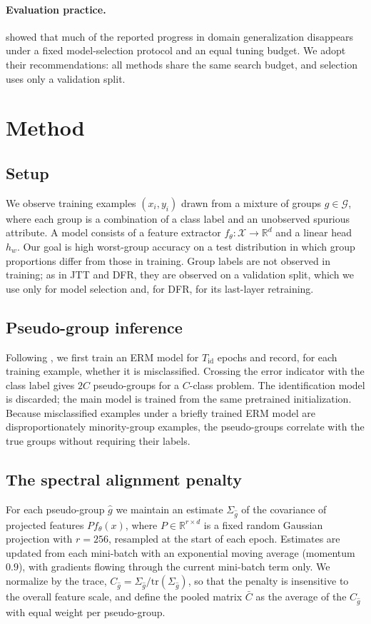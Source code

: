 \documentclass{article}
\begin{document}
\paragraph{Evaluation practice.}
\citet{gulrajani2021search} showed that much of the reported progress in domain generalization disappears under a fixed model-selection protocol and an equal tuning budget. We adopt their recommendations: all methods share the same search budget, and selection uses only a validation split.

\section{Method}
\label{sec:method}

\subsection{Setup}
We observe training examples $(x_i, y_i)$ drawn from a mixture of groups $g \in \mathcal{G}$, where each group is a combination of a class label and an unobserved spurious attribute. A model consists of a feature extractor $f_\theta: \mathcal{X} \to \mathbb{R}^d$ and a linear head $h_w$. Our goal is high worst-group accuracy on a test distribution in which group proportions differ from those in training. Group labels are not observed in training; as in JTT and DFR, they are observed on a validation split, which we use only for model selection and, for DFR, for its last-layer retraining.

\subsection{Pseudo-group inference}
Following \citet{liu2021jtt}, we first train an ERM model for $T_{\mathrm{id}}$ epochs and record, for each training example, whether it is misclassified. Crossing the error indicator with the class label gives $2C$ pseudo-groups for a $C$-class problem. The identification model is discarded; the main model is trained from the same pretrained initialization. Because misclassified examples under a briefly trained ERM model are disproportionately minority-group examples, the pseudo-groups correlate with the true groups without requiring their labels.

\subsection{The spectral alignment penalty}
For each pseudo-group $\hat g$ we maintain an estimate $\Sigma_{\hat g}$ of the covariance of projected features $P f_\theta(x)$, where $P \in \mathbb{R}^{r \times d}$ is a fixed random Gaussian projection with $r = 256$, resampled at the start of each epoch. Estimates are updated from each mini-batch with an exponential moving average (momentum $0.9$), with gradients flowing through the current mini-batch term only. We normalize by the trace, $C_{\hat g} = \Sigma_{\hat g} / \mathrm{tr}(\Sigma_{\hat g})$, so that the penalty is insensitive to the overall feature scale, and define the pooled matrix $\bar C$ as the average of the $C_{\hat g}$ with equal weight per pseudo-group.
\end{document}
